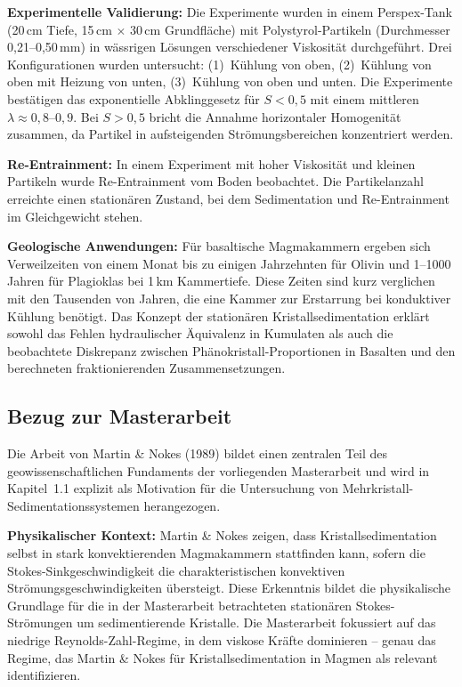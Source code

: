 \documentclass[a4paper,12pt]{article}
\begin{document}
\textbf{Experimentelle Validierung:} Die Experimente wurden in einem Perspex-Tank (20\,cm Tiefe, 15\,cm $\times$ 30\,cm Grundfläche) mit Polystyrol-Partikeln (Durchmesser 0,21--0,50\,mm) in wässrigen Lösungen verschiedener Viskosität durchgeführt. Drei Konfigurationen wurden untersucht: (1)~Kühlung von oben, (2)~Kühlung von oben mit Heizung von unten, (3)~Kühlung von oben und unten. Die Experimente bestätigen das exponentielle Abklinggesetz für $S < 0{,}5$ mit einem mittleren $\lambda \approx 0{,}8$--$0{,}9$. Bei $S > 0{,}5$ bricht die Annahme horizontaler Homogenität zusammen, da Partikel in aufsteigenden Strömungsbereichen konzentriert werden.

\textbf{Re-Entrainment:} In einem Experiment mit hoher Viskosität und kleinen Partikeln wurde Re-Entrainment vom Boden beobachtet. Die Partikelanzahl erreichte einen stationären Zustand, bei dem Sedimentation und Re-Entrainment im Gleichgewicht stehen.

\textbf{Geologische Anwendungen:} Für basaltische Magmakammern ergeben sich Verweilzeiten von einem Monat bis zu einigen Jahrzehnten für Olivin und 1--1000\,Jahren für Plagioklas bei 1\,km Kammertiefe. Diese Zeiten sind kurz verglichen mit den Tausenden von Jahren, die eine Kammer zur Erstarrung bei konduktiver Kühlung benötigt. Das Konzept der stationären Kristallsedimentation erklärt sowohl das Fehlen hydraulischer Äquivalenz in Kumulaten als auch die beobachtete Diskrepanz zwischen Phänokristall-Proportionen in Basalten und den berechneten fraktionierenden Zusammensetzungen.

\subsection*{Bezug zur Masterarbeit}

Die Arbeit von Martin \& Nokes (1989) bildet einen zentralen Teil des geowissenschaftlichen Fundaments der vorliegenden Masterarbeit und wird in Kapitel~1.1 explizit als Motivation für die Untersuchung von Mehrkristall-Sedimentationssystemen herangezogen.

\textbf{Physikalischer Kontext:} Martin \& Nokes zeigen, dass Kristallsedimentation selbst in stark konvektierenden Magmakammern stattfinden kann, sofern die Stokes-Sinkgeschwindigkeit die charakteristischen konvektiven Strömungsgeschwindigkeiten übersteigt. Diese Erkenntnis bildet die physikalische Grundlage für die in der Masterarbeit betrachteten stationären Stokes-Strömungen um sedimentierende Kristalle. Die Masterarbeit fokussiert auf das niedrige Reynolds-Zahl-Regime, in dem viskose Kräfte dominieren -- genau das Regime, das Martin \& Nokes für Kristallsedimentation in Magmen als relevant identifizieren.
\end{document}
